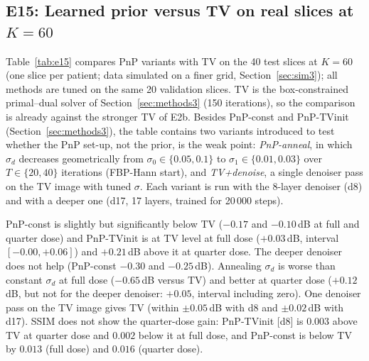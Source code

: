 \subsection{E15: Learned prior versus TV on real slices at $K=60$}\label{sec:e15}
Table~\ref{tab:e15} compares PnP variants with TV on the 40 test slices at $K=60$ (one slice per patient; data simulated on a finer grid, Section~\ref{sec:sim3}); all methods are tuned on the same 20 validation slices.
TV is the box-constrained primal--dual solver of Section~\ref{sec:methods3} (150 iterations), so the comparison is already against the stronger TV of E2b. Besides PnP-const and PnP-TVinit (Section~\ref{sec:methods3}), the table contains
two variants introduced to test whether the PnP set-up, not the prior, is the weak point: \emph{PnP-anneal}, in which $\sigma_d$ decreases geometrically from $\sigma_0\in\{0.05,0.1\}$ to $\sigma_1\in\{0.01,0.03\}$ over $T\in\{20,40\}$ iterations (FBP-Hann start), and \emph{TV+denoise}, a single denoiser pass
on the TV image with tuned $\sigma$. Each variant is run with the 8-layer denoiser (d8) and with a deeper one (d17, 17 layers, trained for 20\,000 steps).

PnP-const is slightly but significantly below TV ($-0.17$ and $-0.10$\,dB at full and quarter dose) and PnP-TVinit is at TV level
at full dose ($+0.03$\,dB, interval $[-0.00,+0.06]$) and $+0.21$\,dB above it at quarter dose. The deeper denoiser does not help (PnP-const $-0.30$ and $-0.25$\,dB). Annealing $\sigma_d$ is worse than constant $\sigma_d$ at full dose ($-0.65$\,dB versus TV) and better at quarter dose ($+0.12$\,dB, but not for the deeper denoiser: $+0.05$, interval including zero).
One denoiser pass on the TV image gives TV (within $\pm0.05$\,dB with d8 and $\pm0.02$\,dB with d17). SSIM does not show the quarter-dose gain: PnP-TVinit [d8] is $0.003$ above TV at quarter dose and $0.002$ below it at full dose, and PnP-const is below TV by $0.013$ (full dose) and $0.016$ (quarter dose).

